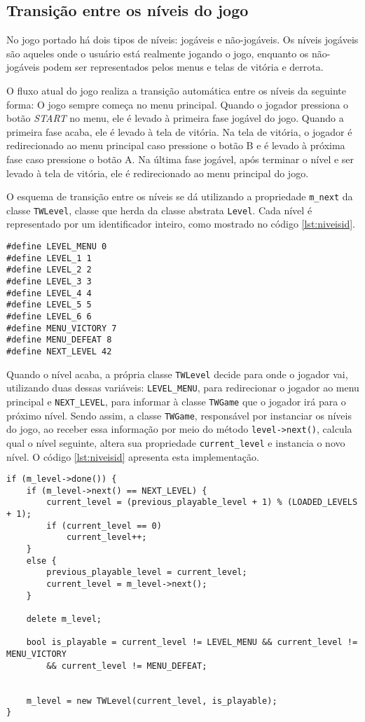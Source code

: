 \subsection{Transição entre os níveis do jogo}

No jogo portado há dois tipos de níveis: jogáveis e não-jogáveis. Os níveis jogáveis são aqueles onde o usuário está realmente jogando o jogo, enquanto os não-jogáveis podem ser representados pelos menus e telas de vitória e derrota.

O fluxo atual do jogo realiza a transição automática entre os níveis da seguinte forma: O jogo sempre começa no menu principal. Quando o jogador pressiona o botão \textit{START} no menu, ele é levado à primeira fase jogável do jogo. Quando a primeira fase acaba, ele é levado à tela de vitória. Na tela de vitória, o jogador é redirecionado ao menu principal caso pressione o botão B e é levado à próxima fase caso pressione o botão A. Na última fase jogável, após terminar o nível e ser levado à tela de vitória, ele é redirecionado ao menu principal do jogo.

O esquema de transição entre os níveis se dá utilizando a propriedade \texttt{m\_next} da classe \texttt{TWLevel}, classe que herda da classe abstrata \texttt{Level}. Cada nível é representado por um identificador inteiro, como mostrado no código \ref{lst:niveisid}.

\begin{lstlisting}[label={lst:niveisid},caption={Identificação dos níveis do jogo.}]
#define LEVEL_MENU 0
#define LEVEL_1 1
#define LEVEL_2 2
#define LEVEL_3 3
#define LEVEL_4 4
#define LEVEL_5 5
#define LEVEL_6 6
#define MENU_VICTORY 7
#define MENU_DEFEAT 8
#define NEXT_LEVEL 42
\end{lstlisting}

Quando o nível acaba, a própria classe \texttt{TWLevel} decide para onde o jogador vai, utilizando duas dessas variáveis: \texttt{LEVEL\_MENU},  para redirecionar o jogador ao menu principal e \texttt{NEXT\_LEVEL}, para informar à classe \texttt{TWGame} que o jogador irá para o próximo nível. Sendo assim, a classe \texttt{TWGame}, responsável por instanciar os níveis do jogo, ao receber essa informação por meio do método \texttt{level->next()}, calcula qual o nível seguinte, altera sua propriedade \texttt{current\_level} e instancia o novo nível. O código \ref{lst:niveisid} apresenta esta implementação.

\begin{lstlisting}[label={lst:niveisid},caption={Transição entre os níveis do jogo.}]
if (m_level->done()) {
    if (m_level->next() == NEXT_LEVEL) {
        current_level = (previous_playable_level + 1) % (LOADED_LEVELS + 1);
        if (current_level == 0)
            current_level++;
    }
    else {
        previous_playable_level = current_level;
        current_level = m_level->next();
    }

    delete m_level;

    bool is_playable = current_level != LEVEL_MENU && current_level != MENU_VICTORY
        && current_level != MENU_DEFEAT;


    m_level = new TWLevel(current_level, is_playable);
}
\end{lstlisting}

